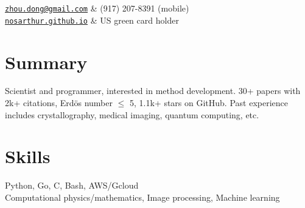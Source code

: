 \documentclass[centered,11pt,overlapped]{res}
\begin{document}


\begin{resume}

\begin{ncolumn}{2}
   {\tt \href{mailto:zhou.dong@gmail.com}{zhou.dong@gmail.com}} &  (917) 207-8391 (mobile) \\
   {\tt \href{https://nosarthur.github.io}{nosarthur.github.io}} &  US green card holder
\end{ncolumn}


\section{\sc Summary}
Scientist and programmer, interested in method development.
30+ papers with 2k+ citations,
Erd\"{o}s number $\le$ 5,
1.1k+ stars on GitHub.
Past experience includes crystallography, medical imaging, quantum computing, etc.


\section{\sc Skills}
Python, Go, C, Bash, AWS/Gcloud\\
Computational physics/mathematics, Image processing, Machine learning



\end{resume}
\end{document}
